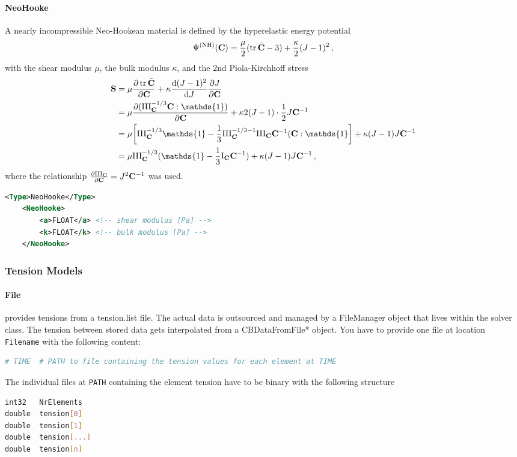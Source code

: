 \paragraph{NeoHooke}
A nearly incompressible Neo-Hookean material is defined by the hyperelastic energy potential
\begin{equation}
    \Psi^{(\mathrm{NH})} (\vec C) = \frac{\mu}{2} (\tr \bar{\vec C} - 3) + \frac{\kappa}{2}(J-1)^2 \,, \label{eq:neohooke}
\end{equation}
with the shear modulus $\mu$, the bulk modulus $\kappa$, and the 2nd Piola-Kirchhoff stress
\begin{align}
    \vec S &= \mu \pdv{\tr \bar{\vec C}}{\vec C} + \kappa \dv{(J-1)^2}{J} \pdv{J}{\vec C} \nonumber \\
    &= \mu \pdv{( \III{C}^{-1/3} \vec C : \mathds{1} )}{\vec C}  + \kappa 2(J-1) \cdot \frac{1}{2} J \vec C^{-1} \nonumber \\
    &= \mu \qty[\III{C}^{-1/3} \mathds{1} - \frac{1}{3}\III{C}^{-1/3 - 1} \III{C} \vec C^{-1} (\vec C : \mathds{1}] + \kappa (J-1) J \vec C^{-1} \nonumber  \\
    &= \mu \III{C}^{-1/3} (\mathds{1} - \frac{1}{3} \I{C} \vec C^{-1}) + \kappa (J-1) J \vec C^{-1} \,,
\end{align}
where the relationship $\pdv{\III{C}}{\vec C} = J^2 \vec C^{-1}$ was used.

\begin{lstlisting}[language=XML,caption=.xml settings for NeoHooke material]
    <Type>NeoHooke</Type>
    <NeoHooke>
        <a>FLOAT</a> <!-- shear modulus [Pa] -->
        <k>FLOAT</k> <!-- bulk modulus [Pa] -->
    </NeoHooke>
\end{lstlisting}

\subsubsection{Tension Models}

\paragraph{File} \label{tension:File} provides tensions from a tension.list file.
The actual data is outsourced and managed by a FileManager object that lives within the solver class. 
The tension between stored data gets interpolated from a CBDataFromFile* object.
You have to provide one file at location \verb|Filename| with the following content:
\begin{lstlisting}[language=Bash,caption=File structure of a tension.list file]
# TIME  # PATH to file containing the tension values for each element at TIME
\end{lstlisting}
The individual files at \verb|PATH| containing the element tension have to be binary with the following structure
\begin{lstlisting}[language=Bash,caption=File structure of individual tension files]
int32   NrElements
double  tension[0]
double  tension[1]
double  tension[...]
double  tension[n]
\end{lstlisting}

